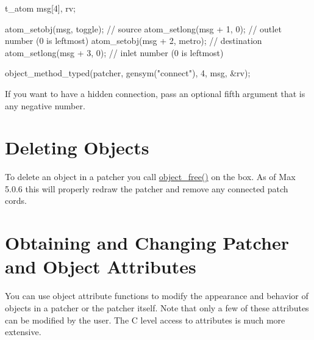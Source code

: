 \begin{DoxyCode}
        t_atom msg[4], rv;

        atom_setobj(msg, toggle);       // source
        atom_setlong(msg + 1, 0);       // outlet number (0 is leftmost)
        atom_setobj(msg + 2, metro);    // destination
        atom_setlong(msg + 3, 0);       // inlet number (0 is leftmost)

        object_method_typed(patcher, gensym("connect"), 4, msg, &rv);
\end{DoxyCode}


If you want to have a hidden connection, pass an optional fifth argument that is any negative number.\hypertarget{chapter_scripting_chapter_scripting_objects_deleting}{}\section{Deleting Objects}\label{chapter_scripting_chapter_scripting_objects_deleting}
To delete an object in a patcher you call \hyperlink{group__obj_ga3759846cb356195532c41e35b87522ee}{object\_\-free()} on the box. As of Max 5.0.6 this will properly redraw the patcher and remove any connected patch cords.\hypertarget{chapter_scripting_chapter_scripting_attrs}{}\section{Obtaining and Changing Patcher and Object Attributes}\label{chapter_scripting_chapter_scripting_attrs}
You can use object attribute functions to modify the appearance and behavior of objects in a patcher or the patcher itself. Note that only a few of these attributes can be modified by the user. The C level access to attributes is much more extensive.

